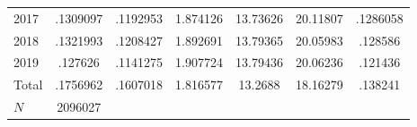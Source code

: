 {\begin{longtable}{l*{1}{cccccc}}
2017        &    .1309097&    .1192953&    1.874126&    13.73626&    20.11807&    .1286058\\
2018        &    .1321993&    .1208427&    1.892691&    13.79365&    20.05983&     .128586\\
2019        &     .127626&    .1141275&    1.907724&    13.79436&    20.06236&     .121436\\
Total       &    .1756962&    .1607018&    1.816577&     13.2688&    18.16279&     .138241\\
\hline
\(N\)       &     2096027&            &            &            &            &            \\
\hline\hline
\end{longtable}
}
